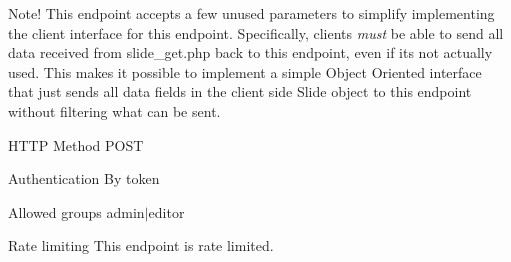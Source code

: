 \begin{DoxyParagraph}{Note!}
This endpoint accepts a few unused parameters to simplify implementing the client interface for this endpoint. Specifically, clients {\itshape must} be able to send all data received from {\ttfamily slide\+\_\+get.\+php} back to this endpoint, even if it\textquotesingle{}s not actually used. This makes it possible to implement a simple Object Oriented interface that just sends all data fields in the client side Slide object to this endpoint without filtering what can be sent.
\end{DoxyParagraph}
\begin{DoxyParagraph}{H\+T\+TP Method}
P\+O\+ST 
\end{DoxyParagraph}
\begin{DoxyParagraph}{Authentication}
By token 
\end{DoxyParagraph}
\begin{DoxyParagraph}{Allowed groups}
{\ttfamily admin$\vert$editor} 
\end{DoxyParagraph}
\begin{DoxyParagraph}{Rate limiting}
This endpoint is rate limited.
\end{DoxyParagraph}

